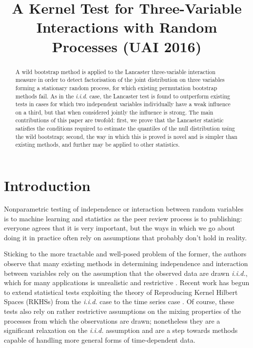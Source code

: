 \documentclass[]{article}
\title{A Kernel Test for Three-Variable Interactions with Random Processes (UAI 2016)}
\author{} %
\begin{document}
\maketitle

\begin{abstract} 

A wild bootstrap method is applied to the Lancaster three-variable interaction measure in order to detect factorisation of the joint distribution on three variables forming a stationary random process, for which existing permutation bootstrap methods fail. As in the \emph{i.i.d.} case, the Lancaster test is found to outperform existing tests in cases for which two independent variables individually have a weak influence on a third, but that when considered jointly the influence is strong. The main contributions of this paper are twofold: first, we prove that the Lancaster statistic satisfies the conditions required to estimate the quantiles of the null distribution using the wild bootstrap; second, the way in which this is proved is novel and is simpler than existing methods, and further may be applied to other statistics.

\end{abstract} 

\section{Introduction}
\label{introduction}

Nonparametric testing of independence or interaction between random variables is to machine learning and statistics as the peer review process is to publishing: everyone agrees that it is very important, but the ways in which we go about doing it in practice often rely on assumptions that probably don't hold in reality. 

Sticking to the more tractable and well-posed problem of the former, the authors observe that many existing methods in determining independence and interaction between variables rely on the assumption that the observed data are drawn \emph{i.i.d.}, which for many applications is unrealistic and restrictive \cite{gretton2005measuring}\cite{gretton2007kernel}\cite{gretton2005kernel}\cite{sejdinovic2013kernel}. Recent work has begun to extend statistical tests exploiting the theory of Reproducing Kernel Hilbert Spaces (RKHSs) from the \emph{i.i.d.} case to the time series case \cite{chwialkowski2014wild}\cite{chwialkowski2014kernel}. Of course, these tests also rely on rather restrictive assumptions on the mixing properties of the processes from which the observations are drawn; nonetheless they are a significant relaxation on the \emph{i.i.d.} assumption and are a step towards methods capable of handling more general forms of time-dependent data. 
\end{document}
